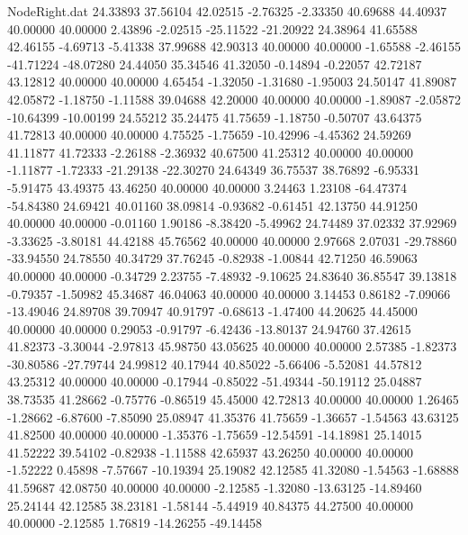 \begin{filecontents}{NodeRight.dat}
  24.33893   37.56104   42.02515    -2.76325   -2.33350   40.69688   44.40937   40.00000   40.00000    2.43896   -2.02515  -25.11522  -21.20922
  24.38964   41.65588   42.46155    -4.69713   -5.41338   37.99688   42.90313   40.00000   40.00000   -1.65588   -2.46155  -41.71224  -48.07280
  24.44050   35.34546   41.32050    -0.14894   -0.22057   42.72187   43.12812   40.00000   40.00000    4.65454   -1.32050   -1.31680   -1.95003
  24.50147   41.89087   42.05872    -1.18750   -1.11588   39.04688   42.20000   40.00000   40.00000   -1.89087   -2.05872  -10.64399  -10.00199
  24.55212   35.24475   41.75659    -1.18750   -0.50707   43.64375   41.72813   40.00000   40.00000    4.75525   -1.75659  -10.42996   -4.45362
  24.59269   41.11877   41.72333    -2.26188   -2.36932   40.67500   41.25312   40.00000   40.00000   -1.11877   -1.72333  -21.29138  -22.30270
  24.64349   36.75537   38.76892    -6.95331   -5.91475   43.49375   43.46250   40.00000   40.00000    3.24463    1.23108  -64.47374  -54.84380
  24.69421   40.01160   38.09814    -0.93682   -0.61451   42.13750   44.91250   40.00000   40.00000   -0.01160    1.90186   -8.38420   -5.49962
  24.74489   37.02332   37.92969    -3.33625   -3.80181   44.42188   45.76562   40.00000   40.00000    2.97668    2.07031  -29.78860  -33.94550
  24.78550   40.34729   37.76245    -0.82938   -1.00844   42.71250   46.59063   40.00000   40.00000   -0.34729    2.23755   -7.48932   -9.10625
  24.83640   36.85547   39.13818    -0.79357   -1.50982   45.34687   46.04063   40.00000   40.00000    3.14453    0.86182   -7.09066  -13.49046
  24.89708   39.70947   40.91797    -0.68613   -1.47400   44.20625   44.45000   40.00000   40.00000    0.29053   -0.91797   -6.42436  -13.80137
  24.94760   37.42615   41.82373    -3.30044   -2.97813   45.98750   43.05625   40.00000   40.00000    2.57385   -1.82373  -30.80586  -27.79744
  24.99812   40.17944   40.85022    -5.66406   -5.52081   44.57812   43.25312   40.00000   40.00000   -0.17944   -0.85022  -51.49344  -50.19112
  25.04887   38.73535   41.28662    -0.75776   -0.86519   45.45000   42.72813   40.00000   40.00000    1.26465   -1.28662   -6.87600   -7.85090
  25.08947   41.35376   41.75659    -1.36657   -1.54563   43.63125   41.82500   40.00000   40.00000   -1.35376   -1.75659  -12.54591  -14.18981
  25.14015   41.52222   39.54102    -0.82938   -1.11588   42.65937   43.26250   40.00000   40.00000   -1.52222    0.45898   -7.57667  -10.19394
  25.19082   42.12585   41.32080    -1.54563   -1.68888   41.59687   42.08750   40.00000   40.00000   -2.12585   -1.32080  -13.63125  -14.89460
  25.24144   42.12585   38.23181    -1.58144   -5.44919   40.84375   44.27500   40.00000   40.00000   -2.12585    1.76819  -14.26255  -49.14458

\end{filecontents}
